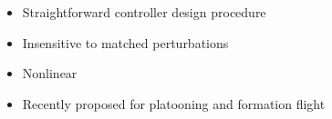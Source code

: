 \documentclass[12pt,svgnames,table,draft=false]{beamer}
\begin{document}

\begin{frame}\frametitle{}
\centering

\begin{tcolorbox}[colback=blue!5!white,colframe=blue!75!black,title=Ideal Sliding Mode Control, width=20em,
standard jigsaw,
opacityback=.7]
\begin{itemize}
\item Straightforward controller design procedure
\item Insensitive to {matched} perturbations
\item Nonlinear
\item Recently proposed for platooning \cite{Fahimi2007} and formation flight \cite{galzi2006uav}
\end{itemize}
\end{tcolorbox}

\end{frame}
\end{document}
